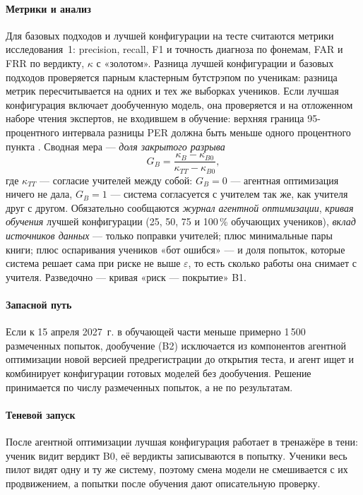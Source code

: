 \paragraph{Метрики и анализ} Для базовых подходов и лучшей конфигурации на тесте считаются метрики
исследования~1: precision, recall, F1 и точность диагноза по фонемам, FAR и FRR по вердикту, $\kappa$ с
«золотом». Разница лучшей конфигурации и базовых подходов проверяется парным кластерным бутстрэпом по
ученикам: разница метрик пересчитывается на одних и тех же выборках учеников. Если лучшая конфигурация
включает дообученную модель, она проверяется и на отложенном наборе чтения экспертов, не входившем в
обучение: верхняя граница 95-процентного интервала разницы PER должна быть меньше одного процентного
пункта \cite{SRC-118}. Сводная мера --- \emph{доля закрытого разрыва}
\begin{equation}
  G_B = \frac{\kappa_B - \kappa_{B0}}{\kappa_{TT} - \kappa_{B0}},
\end{equation}
где $\kappa_{TT}$ --- согласие учителей между собой: $G_B=0$ --- агентная оптимизация ничего не дала, $G_B=1$ ---
система согласуется с учителем так же, как учителя друг с другом. Обязательно сообщаются \emph{журнал агентной оптимизации}, \emph{кривая
обучения} лучшей конфигурации (25, 50, 75 и 100\,\% обучающих учеников), \emph{вклад источников данных} --- только поправки
учителей; плюс минимальные пары книги; плюс оспаривания учеников «бот ошибся» --- и доля попыток, которые
система решает сама при риске не выше $\varepsilon$, то есть сколько работы она снимает с учителя. Разведочно
--- кривая «риск --- покрытие» B1.

\paragraph{Запасной путь} Если к 15 апреля 2027~г. в обучающей части меньше примерно 1\,500 размеченных
попыток, дообучение (B2) исключается из компонентов агентной оптимизации новой версией предрегистрации до открытия
теста, и агент ищет и комбинирует конфигурации готовых моделей без дообучения. Решение принимается по числу размеченных попыток, а не по
результатам.

\paragraph{Теневой запуск} После агентной оптимизации лучшая конфигурация работает в тренажёре в тени: ученик видит
вердикт B0, её вердикты записываются в попытку. Ученики весь пилот видят одну и ту же систему, поэтому
смена модели не смешивается с их продвижением, а попытки после обучения дают описательную проверку.

